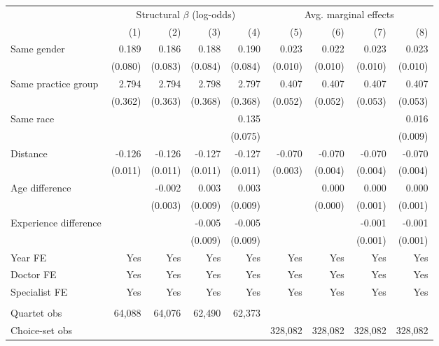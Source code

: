 
\begin{tabular}{lrrrrrrrr}
\toprule
\multicolumn{1}{c}{ } & \multicolumn{4}{c}{Structural $\beta$ (log-odds)} & \multicolumn{4}{c}{Avg. marginal effects} \\
\cmidrule(l{3pt}r{3pt}){2-5} \cmidrule(l{3pt}r{3pt}){6-9}
 & (1) & (2) & (3) & (4) & (5) & (6) & (7) & (8)\\
\midrule
Same gender & 0.189 & 0.186 & 0.188 & 0.190 & 0.023 & 0.022 & 0.023 & 0.023\\
 & (0.080) & (0.083) & (0.084) & (0.084) & (0.010) & (0.010) & (0.010) & (0.010)\\
Same practice group & 2.794 & 2.794 & 2.798 & 2.797 & 0.407 & 0.407 & 0.407 & 0.407\\
 & (0.362) & (0.363) & (0.368) & (0.368) & (0.052) & (0.052) & (0.053) & (0.053)\\
Same race &  &  &  & 0.135 &  &  &  & 0.016\\
 &  &  &  & (0.075) &  &  &  & (0.009)\\
Distance & -0.126 & -0.126 & -0.127 & -0.127 & -0.070 & -0.070 & -0.070 & -0.070\\
 & (0.011) & (0.011) & (0.011) & (0.011) & (0.003) & (0.004) & (0.004) & (0.004)\\
Age difference &  & -0.002 & 0.003 & 0.003 &  & 0.000 & 0.000 & 0.000\\
 &  & (0.003) & (0.009) & (0.009) &  & (0.000) & (0.001) & (0.001)\\
Experience difference &  &  & -0.005 & -0.005 &  &  & -0.001 & -0.001\\
 &  &  & (0.009) & (0.009) &  &  & (0.001) & (0.001)\\
\midrule
Year FE & Yes & Yes & Yes & Yes & Yes & Yes & Yes & Yes\\
Doctor FE & Yes & Yes & Yes & Yes & Yes & Yes & Yes & Yes\\
Specialist FE & Yes & Yes & Yes & Yes & Yes & Yes & Yes & Yes\\
\midrule\\
Quartet obs & 64,088 & 64,076 & 62,490 & 62,373 &  &  &  & \\
Choice-set obs &  &  &  &  & 328,082 & 328,082 & 328,082 & 328,082\\
\bottomrule
\end{tabular}
